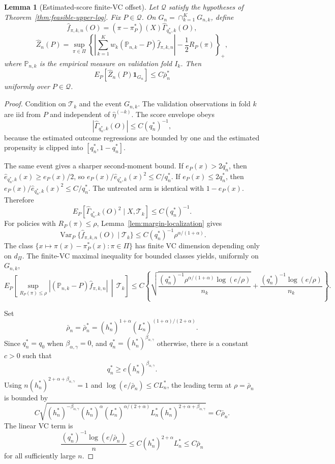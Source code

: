 \documentclass[11pt]{article}
\newcommand{\one}{\mathbf{1}}
\theoremstyle{definition}
\theoremstyle{plain}
\newtheorem{lemma}{Lemma}
\theoremstyle{remark}
\begin{document}
\begin{lemma}[Estimated-score finite-VC offset]\label{lem:feasible-vc-offset}
Let \(\mathcal Q\) satisfy the hypotheses of
Theorem~\ref{thm:feasible-upper-log}.  Fix \(P\in\mathcal Q\).  On
\(G_n=\cap_{k=1}^K G_{n,k}\), define
\[
\widehat f_{\pi,k,n}(O)=(\pi-\pi_P^*)(X)\widehat\Gamma_{q_n^*,k}(O),
\]
\[
\widehat Z_n(P)=
\sup_{\pi\in\Pi}
\left\{
\left|\sum_{k=1}^K w_k
(\mathbb P_{n,k}-P)\widehat f_{\pi,k,n}\right|
-\frac12R_P(\pi)
\right\}_+,
\]
where \(\mathbb P_{n,k}\) is the empirical measure on validation fold
\(I_k\).  Then
\[
E_P[\widehat Z_n(P)\one_{G_n}]
\le C\bar\rho_n^*
\]
uniformly over \(P\in\mathcal Q\).
\end{lemma}
\begin{proof}
Condition on \(\mathcal T_k\) and the event \(G_{n,k}\).  The validation
observations in fold \(k\) are iid from \(P\) and independent of
\(\widehat\eta^{(-k)}\).  The score envelope obeys
\[
|\widehat\Gamma_{q_n^*,k}(O)|\le C(q_n^*)^{-1},
\]
because the estimated outcome regressions are bounded by one and the
estimated propensity is clipped into \([q_n^*,1-q_n^*]\).

The same event gives a sharper second-moment bound.  If \(e_P(x)>2q_n^*\),
then \(\widehat e_{q_n^*,k}(x)\ge e_P(x)/2\), so
\(e_P(x)/\widehat e_{q_n^*,k}(x)^2\le C/q_n^*\).  If \(e_P(x)\le2q_n^*\),
then \(e_P(x)/\widehat e_{q_n^*,k}(x)^2\le C/q_n^*\).  The untreated arm is
identical with \(1-e_P(x)\).  Therefore
\[
E_P[\widehat\Gamma_{q_n^*,k}(O)^2\mid X,\mathcal T_k]
\le C(q_n^*)^{-1}.
\]
For policies with \(R_P(\pi)\le\rho\), Lemma~\ref{lem:margin-localization}
gives
\[
\operatorname{Var}_P\{\widehat f_{\pi,k,n}(O)\mid\mathcal T_k\}
\le C(q_n^*)^{-1}\rho^{\alpha/(1+\alpha)}.
\]
The class \(\{x\mapsto \pi(x)-\pi_P^*(x):\pi\in\Pi\}\) has finite VC
dimension depending only on \(d_\Pi\).  The finite-VC maximal inequality for
bounded classes yields, uniformly on \(G_{n,k}\),
\[
E_P\!\left[
\sup_{R_P(\pi)\le\rho}
|(\mathbb P_{n,k}-P)\widehat f_{\pi,k,n}|
\,\middle|\,\mathcal T_k\right]
\le
C\left\{
\sqrt{\frac{(q_n^*)^{-1}\rho^{\alpha/(1+\alpha)}
\log(e/\rho)}{n_k}}
+\frac{(q_n^*)^{-1}\log(e/\rho)}{n_k}
\right\}.
\]

Set
\[
\bar\rho_n=\bar\rho_n^*
=(h_n^*)^{1+\alpha}(L_n^*)^{(1+\alpha)/(2+\alpha)}.
\]
Since \(q_n^*=q_0\) when \(\beta_{\alpha,\gamma}=0\), and
\(q_n^*=(h_n^*)^{\beta_{\alpha,\gamma}}\) otherwise, there is a constant
\(c>0\) such that
\[
q_n^*\ge c(h_n^*)^{\beta_{\alpha,\gamma}}.
\]
Using \(n(h_n^*)^{2+\alpha+\beta_{\alpha,\gamma}}=1\) and
\(\log(e/\bar\rho_n)\le C L_n^*\), the leading term at
\(\rho=\bar\rho_n\) is bounded by
\[
C\sqrt{
(h_n^*)^{-\beta_{\alpha,\gamma}}
(h_n^*)^\alpha
(L_n^*)^{\alpha/(2+\alpha)}
L_n^*
(h_n^*)^{2+\alpha+\beta_{\alpha,\gamma}}
}
=C\bar\rho_n.
\]
The linear VC term is
\[
\frac{(q_n^*)^{-1}\log(e/\bar\rho_n)}{n}
\le
C(h_n^*)^{2+\alpha}L_n^*
\le C\bar\rho_n
\]
for all sufficiently large \(n\).


\end{proof}
\end{document}
